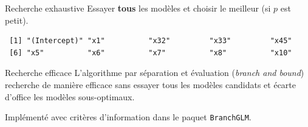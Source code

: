 \documentclass[
  ignorenonframetext,
]{beamer}
\newenvironment{Shaded}{\begin{snugshade}}{\end{snugshade}}
\newcommand{\AttributeTok}[1]{\textcolor[rgb]{0.40,0.45,0.13}{#1}}
\newcommand{\CommentTok}[1]{\textcolor[rgb]{0.37,0.37,0.37}{#1}}
\newcommand{\ConstantTok}[1]{\textcolor[rgb]{0.56,0.35,0.01}{#1}}
\newcommand{\DecValTok}[1]{\textcolor[rgb]{0.68,0.00,0.00}{#1}}
\newcommand{\FunctionTok}[1]{\textcolor[rgb]{0.28,0.35,0.67}{#1}}
\newcommand{\NormalTok}[1]{\textcolor[rgb]{0.00,0.23,0.31}{#1}}
\newcommand{\OtherTok}[1]{\textcolor[rgb]{0.00,0.23,0.31}{#1}}
\newcommand{\SpecialCharTok}[1]{\textcolor[rgb]{0.37,0.37,0.37}{#1}}
\newcommand{\StringTok}[1]{\textcolor[rgb]{0.13,0.47,0.30}{#1}}
\begin{document}
\begin{frame}[fragile]{Recherche exhaustive}
\label{recherche-exhaustive}
Essayer \textbf{tous} les modèles et choisir le meilleur (si \(p\) est
petit).

\footnotesize

\begin{Shaded}
\end{Shaded}

\begin{verbatim}
 [1] "(Intercept)" "x1"          "x32"         "x33"         "x45"        
 [6] "x5"          "x6"          "x7"          "x8"          "x10"        
\end{verbatim}

\normalsize
\end{frame}

\begin{frame}[fragile]{Recherche efficace}
\label{recherche-efficace}
L'algorithme par séparation et évaluation (\emph{branch and bound})
recherche de manière efficace sans essayer tous les modèles candidats et
écarte d'office les modèles sous-optimaux.

Implémenté avec critères d'information dans le paquet
\texttt{BranchGLM}.
\end{frame}
\end{document}
